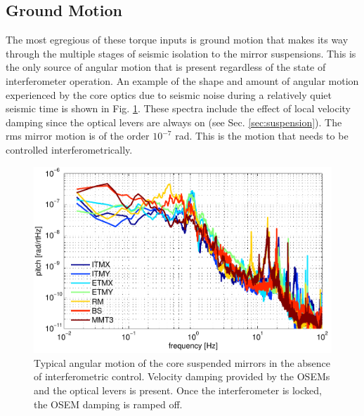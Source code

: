 \subsection{Ground Motion} 
The most egregious of these torque inputs is ground motion that makes its way through the multiple stages of seismic isolation to the mirror suspensions. 
This is the only source of angular motion that is present regardless of the state of interferometer operation. An example of the shape and amount of angular motion experienced by the core optics due to seismic noise during a relatively quiet seismic time is shown in Fig. \ref{fig:seismicMirror}. These spectra include the effect of local velocity damping since the optical levers are always on (see Sec. \ref{sec:suspension}). The rms mirror motion is of the order $10^{-7}$ rad. This is the motion that needs to be controlled interferometrically.

\begin{figure}
\begin{centering}
\includegraphics[width=1.0\columnwidth]{figures/seismic_mirrormotion.pdf}
\caption[Typical angular motion of the core suspended mirrors in the
  absence of interferometric control]{Typical angular motion of the core suspended mirrors in the
  absence of interferometric control. Velocity damping provided by the
 OSEMs and the optical levers is present. Once the interferometer is locked, the OSEM damping is ramped off. 
}
\label{fig:seismicMirror}
\end{centering}
\end{figure}

